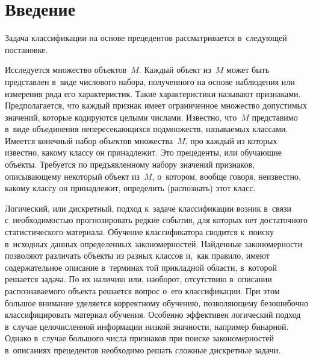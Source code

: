 
  
\vspace*{-2pt}



\thispagestyle{headings}

\begin{multicols}{2}

\label{st\stat}

\section{Введение}


  Задача классификации на основе прецедентов рас\-смат\-ри\-ва\-ет\-ся в~сле\-ду\-ющей 
по\-ста\-новке.
  
  Исследуется множество объектов~$M$. Каждый объект из~$M$ может быть 
пред\-став\-лен в~виде чис\-ло\-во\-го набора, полученного на основе наблюдения или 
измерения ряда его характеристик. Такие характеристики называют 
при\-зна\-ка\-ми. Предполагается, что каж\-дый при\-знак имеет ограниченное 
множество до\-пус\-ти\-мых значений, которые кодируются целыми чис\-ла\-ми. 
Известно, что~$M$ пред\-ста\-ви\-мо в~виде объединения не\-пе\-ре\-се\-ка\-ющих\-ся 
подмножеств, на\-зы\-ва\-емых классами. Имеется конечный набор объектов 
множества~$M$, про каж\-дый из которых известно, какому классу он 
принадлежит. Это прецеденты, или обуча\-ющие объекты. Требуется по 
предъявленному набору значений признаков, опи\-сы\-ва\-юще\-му некоторый объект 
из~$M$, о~котором, вообще говоря, неизвестно, какому классу он 
принадлежит, определить (рас\-по\-знать) этот класс. 
  
  Логический, или дискретный, подход к~задаче классификации возник в~связи 
с~не\-об\-хо\-ди\-мостью прогнозировать ред\-кие события, для которых нет 
достаточного статистического материала. Обучение классификатора сводится 
к~поиску в~исходных данных определенных закономерностей. Найденные 
закономерности поз\-во\-ля\-ют различать объекты из разных классов и,~как 
правило, имеют содержательное описание в~терминах той при\-клад\-ной  
об\-ласти, в~которой решается задача. По их наличию или, наоборот, 
отсутствию в~описании рас\-по\-зна\-ва\-емо\-го объекта решается вопрос о~его 
классификации. При этом большое внимание уделяется корректному обуче\-нию, 
поз\-во\-ля\-юще\-му безошибочно классифицировать материал обуче\-ния. Особенно 
эффективен логический подход в~случае це\-ло\-чис\-лен\-ной информации низ\-кой 
знач\-ности, например бинарной. Однако в~случае большого чис\-ла признаков при 
поиске закономерностей в~описаниях прецедентов необходимо решать слож\-ные 
дис\-крет\-ные задачи. 
  

\end{multicols}
